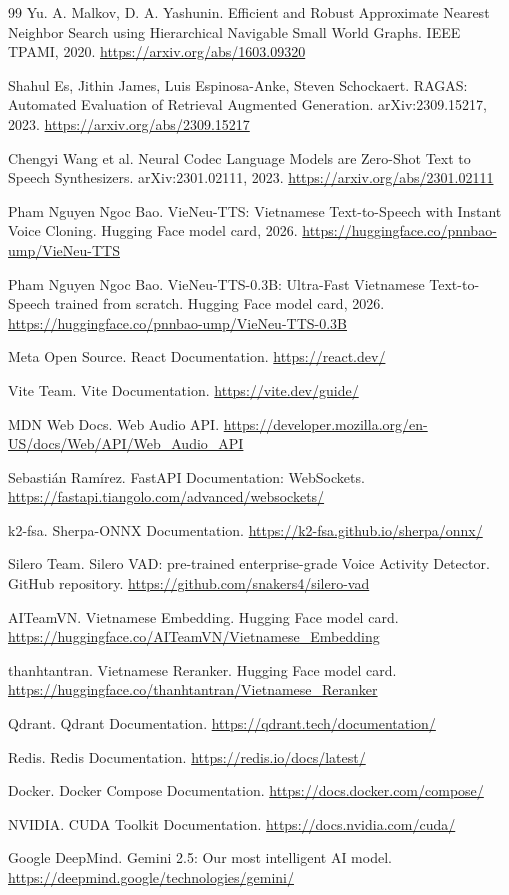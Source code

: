 \documentclass[a4paper,13pt,twoside]{report}
\begin{document}
\begin{thebibliography}{99}
    Yu. A. Malkov, D. A. Yashunin. Efficient and Robust Approximate Nearest Neighbor Search using Hierarchical Navigable Small World Graphs. IEEE TPAMI, 2020. \url{https://arxiv.org/abs/1603.09320}

    Shahul Es, Jithin James, Luis Espinosa-Anke, Steven Schockaert. RAGAS: Automated Evaluation of Retrieval Augmented Generation. arXiv:2309.15217, 2023. \url{https://arxiv.org/abs/2309.15217}

    Chengyi Wang et al. Neural Codec Language Models are Zero-Shot Text to Speech Synthesizers. arXiv:2301.02111, 2023. \url{https://arxiv.org/abs/2301.02111}

    Pham Nguyen Ngoc Bao. VieNeu-TTS: Vietnamese Text-to-Speech with Instant Voice Cloning. Hugging Face model card, 2026. \url{https://huggingface.co/pnnbao-ump/VieNeu-TTS}

    Pham Nguyen Ngoc Bao. VieNeu-TTS-0.3B: Ultra-Fast Vietnamese Text-to-Speech trained from scratch. Hugging Face model card, 2026. \url{https://huggingface.co/pnnbao-ump/VieNeu-TTS-0.3B}

    Meta Open Source. React Documentation. \url{https://react.dev/}

    Vite Team. Vite Documentation. \url{https://vite.dev/guide/}

    MDN Web Docs. Web Audio API. \url{https://developer.mozilla.org/en-US/docs/Web/API/Web_Audio_API}

    Sebastián Ramírez. FastAPI Documentation: WebSockets. \url{https://fastapi.tiangolo.com/advanced/websockets/}

    k2-fsa. Sherpa-ONNX Documentation. \url{https://k2-fsa.github.io/sherpa/onnx/}

    Silero Team. Silero VAD: pre-trained enterprise-grade Voice Activity Detector. GitHub repository. \url{https://github.com/snakers4/silero-vad}

    AITeamVN. Vietnamese Embedding. Hugging Face model card. \url{https://huggingface.co/AITeamVN/Vietnamese_Embedding}

    thanhtantran. Vietnamese Reranker. Hugging Face model card. \url{https://huggingface.co/thanhtantran/Vietnamese_Reranker}

    Qdrant. Qdrant Documentation. \url{https://qdrant.tech/documentation/}

    Redis. Redis Documentation. \url{https://redis.io/docs/latest/}

    Docker. Docker Compose Documentation. \url{https://docs.docker.com/compose/}

    NVIDIA. CUDA Toolkit Documentation. \url{https://docs.nvidia.com/cuda/}

    Google DeepMind. Gemini 2.5: Our most intelligent AI model. \url{https://deepmind.google/technologies/gemini/}

\end{thebibliography}
\end{document}
